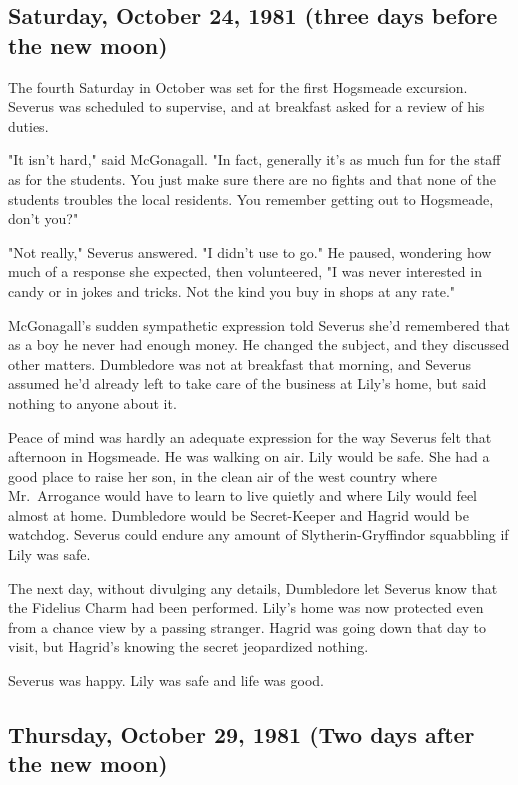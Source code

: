 \subsection{Saturday, October 24, 1981 (three days before the new moon)}

The fourth Saturday in October was set for the first Hogsmeade excursion. Severus was scheduled to supervise, and at breakfast asked for a review of his duties.

"It isn't hard," said McGonagall. "In fact, generally it's as much fun for the staff as for the students. You just make sure there are no fights and that none of the students troubles the local residents. You remember getting out to Hogsmeade, don't you?"

"Not really," Severus answered. "I didn't use to go." He paused, wondering how much of a response she expected, then volunteered, "I was never interested in candy or in jokes and tricks. Not the kind you buy in shops at any rate."

McGonagall's sudden sympathetic expression told Severus she'd remembered that as a boy he never had enough money. He changed the subject, and they discussed other matters. Dumbledore was not at breakfast that morning, and Severus assumed he'd already left to take care of the business at Lily's home, but said nothing to anyone about it.

Peace of mind was hardly an adequate expression for the way Severus felt that afternoon in Hogsmeade. He was walking on air. Lily would be safe. She had a good place to raise her son, in the clean air of the west country where Mr.~Arrogance would have to learn to live quietly and where Lily would feel almost at home. Dumbledore would be Secret-Keeper and Hagrid would be watchdog. Severus could endure any amount of Slytherin-Gryffindor squabbling if Lily was safe.

The next day, without divulging any details, Dumbledore let Severus know that the Fidelius Charm had been performed. Lily's home was now protected even from a chance view by a passing stranger. Hagrid was going down that day to visit, but Hagrid's knowing the secret jeopardized nothing.

Severus was happy. Lily was safe and life was good.

\subsection{Thursday, October 29, 1981 (Two days after the new moon)}

